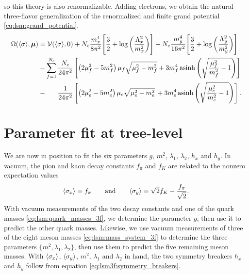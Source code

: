 so this theory is also renormalizable.
Adding electrons, we obtain the natural three-flavor generalization of the renormalized and finite grand potential \eqref{eq:lsm:grand_potential},
\begin{equation}
\begin{split}
	\Omega(\avg{\sigma},\vec{\mu}) &= \pot(\avg{\sigma},0) + N_c \frac{m_x^4}{8 \pi^2} \Bigg[ \frac{3}{2} + \log\bigg(\frac{\Lambda_x^2}{m_x^2}\bigg) \Bigg] + N_c \frac{m_y^4}{16 \pi^2} \Bigg[ \frac{3}{2} + \log\bigg(\frac{\Lambda_y^2}{m_y^2}\bigg) \Bigg] \\ %
	                               &-\smashoperator{\sum_{f=1}^{N_c}} \frac{N_c}{24 \pi^2} \left[ \left( 2 \mu_f^2 - 5 m_f^2 \right) \mu_f \sqrt{\mu_f^2 - m_f^2} + 3 m_f^4 \asinh \left( \sqrt{\frac{\mu_{\smash{f}}^2}{m_f^2}-1} \right) \right] \\
	                               &-\phantom{\sum} \, \frac{1}{24 \pi^2} \left[ \left( 2 \mu_e^2 - 5 m_e^2 \right) \mu_e \sqrt{\mu_e^2 - m_e^2} \, + 3 m_e^4 \asinh \left( \sqrt{\frac{\mu_{\smash{e}}^2}{m_e^2}-1} \right) \right].
\end{split}
\label{eq:lsm3f:grand_potential}
\end{equation}

\section{Parameter fit at tree-level}
\label{sec:lsm3f:parameter_fit}

We are now in position to fit the six parameters $g$, $m^2$, $\lambda_1$, $\lambda_2$, $h_x$ and $h_y$.
In vacuum, the pion and kaon decay constants $f_\pi$ and $f_K$ are related to the nonzero expectation values
\cite{ref:lsm3f_details}
\begin{equation}
	\langle \sigma_x \rangle = f_\pi
	\qquad \text{and} \qquad
	\langle \sigma_y \rangle = \sqrt{2} f_K - \frac{f_\pi}{\sqrt{2}}.
\label{eq:lsm3f:decay_constants}
\end{equation}
With vacuum measurements of the two decay constants and one of the quark masses \eqref{eq:lsm:quark_masses_3f},
we determine the parameter $g$, then use it to predict the other quark masses.
Likewise, we use vacuum measurements of three of the eight meson masses \eqref{eq:lsm:mass_system_3f} to determine the three parameters $\{m^2, \lambda_1, \lambda_2\}$,
then use them to predict the five remaining meson masses.
With $\langle \sigma_x \rangle$, $\langle \sigma_y \rangle$, $m^2$, $\lambda_1$ and $\lambda_2$ in hand,
the two symmetry breakers $h_x$ and $h_y$ follow from equation \eqref{eq:lsm3f:symmetry_breakers}.

